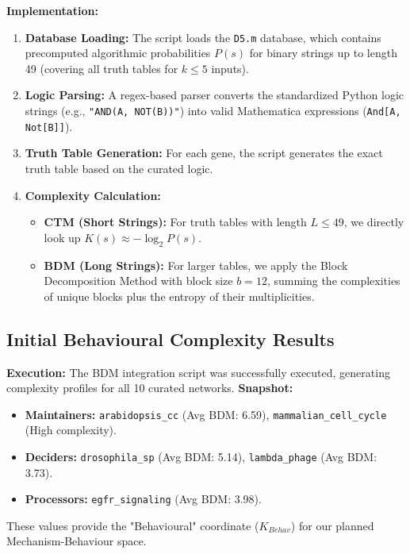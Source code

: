 \textbf{Implementation:}
\begin{enumerate}
    \item \textbf{Database Loading:} The script loads the \texttt{D5.m} database, which contains precomputed algorithmic probabilities $P(s)$ for binary strings up to length 49 (covering all truth tables for $k \le 5$ inputs).
    \item \textbf{Logic Parsing:} A regex-based parser converts the standardized Python logic strings (e.g., \texttt{"AND(A, NOT(B))"}) into valid Mathematica expressions (\texttt{And[A, Not[B]]}).
    \item \textbf{Truth Table Generation:} For each gene, the script generates the exact truth table based on the curated logic.
    \item \textbf{Complexity Calculation:}
    \begin{itemize}
        \item \textbf{CTM (Short Strings):} For truth tables with length $L \le 49$, we directly look up $K(s) \approx -\log_2 P(s)$.
        \item \textbf{BDM (Long Strings):} For larger tables, we apply the Block Decomposition Method with block size $b=12$, summing the complexities of unique blocks plus the entropy of their multiplicities.
    \end{itemize}
\end{enumerate}


\subsection{Initial Behavioural Complexity Results}
\textbf{Execution:} The BDM integration script was successfully executed, generating complexity profiles for all 10 curated networks.
\textbf{Snapshot:}
\begin{itemize}
    \item \textbf{Maintainers:} \texttt{arabidopsis\_cc} (Avg BDM: 6.59), \texttt{mammalian\_cell\_cycle} (High complexity).
    \item \textbf{Deciders:} \texttt{drosophila\_sp} (Avg BDM: 5.14), \texttt{lambda\_phage} (Avg BDM: 3.73).
    \item \textbf{Processors:} \texttt{egfr\_signaling} (Avg BDM: 3.98).
\end{itemize}
These values provide the "Behavioural" coordinate ($K_{Behav}$) for our planned Mechanism-Behaviour space.

